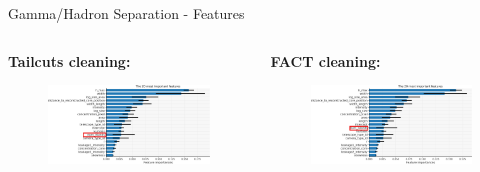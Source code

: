 \begin{frame}{Gamma/Hadron Separation - Features}
    \begin{columns}[T] %
        \begin{column}{.48\textwidth}
            \textbf{Tailcuts cleaning:}
            \vspace{5pt}
            \begin{figure}
                \includegraphics[width=\linewidth]{images/result_plots/tail1/sep_diff_4-crop2.png}
            \end{figure}
        \end{column}
        \begin{column}{.48\textwidth}
            \textbf{FACT cleaning:}
            \vspace{5pt}
            \begin{figure}
                \includegraphics[width=\linewidth]{images/result_plots/fact2/sep_diff_4-crop2.png}                
            \end{figure}
        \end{column}
    \end{columns}
\end{frame}

